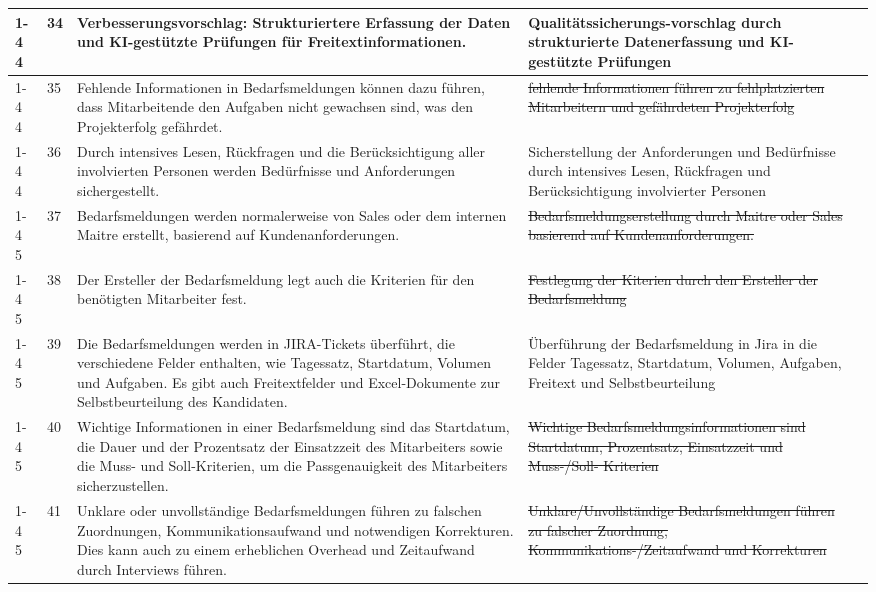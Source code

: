 \begin{longtable}{| p{0.5cm} | p{0.5cm} | p{4cm} | p{4cm} | p{4cm} |}
	\cline{1-4}
	4 & 34 & Verbesserungsvorschlag: Strukturiertere Erfassung der Daten und KI-gestützte Prüfungen für Freitextinformationen. & Qualitätssicherungs-vorschlag durch strukturierte Datenerfassung und KI-gestützte Prüfungen & \\ 
	\cline{1-4}
	4 & 35 & Fehlende Informationen in Bedarfsmeldungen können dazu führen, dass Mitarbeitende den Aufgaben nicht gewachsen sind, was den Projekterfolg gefährdet. & \st{fehlende Informationen führen zu fehlplatzierten Mitarbeitern und gefährdeten Projekterfolg} & \\ 
	\cline{1-4}
	4 & 36 & Durch intensives Lesen, Rückfragen und die Berücksichtigung aller involvierten Personen werden Bedürfnisse und Anforderungen sichergestellt. & Sicherstellung der Anforderungen und Bedürfnisse durch intensives Lesen, Rückfragen und Berücksichtigung involvierter Personen & \\ 
	\cline{1-4}
	5 & 37 & Bedarfsmeldungen werden normalerweise von Sales oder dem internen Maitre erstellt, basierend auf Kundenanforderungen. & \st{Bedarfsmeldungserstellung durch Maitre oder Sales basierend auf Kundenanforderungen.} & \\ 
	\cline{1-4}
	5 & 38 & Der Ersteller der Bedarfsmeldung legt auch die Kriterien für den benötigten Mitarbeiter fest. & \st{Festlegung der Kiterien durch den Ersteller der Bedarfsmeldung} & \\ 
	\cline{1-4}
	5 & 39 & Die Bedarfsmeldungen werden in JIRA-Tickets überführt, die verschiedene Felder enthalten, wie Tagessatz, Startdatum, Volumen und Aufgaben. Es gibt auch Freitextfelder und Excel-Dokumente zur Selbstbeurteilung des Kandidaten. & Überführung der Bedarfsmeldung in Jira in die Felder Tagessatz, Startdatum, Volumen, Aufgaben, Freitext und Selbstbeurteilung & \\ 
	\cline{1-4}
	5 & 40 & Wichtige Informationen in einer Bedarfsmeldung sind das Startdatum, die Dauer und der Prozentsatz der Einsatzzeit des Mitarbeiters sowie die Muss- und Soll-Kriterien, um die Passgenauigkeit des Mitarbeiters sicherzustellen. & \st{Wichtige Bedarfsmeldungsinformationen sind Startdatum, Prozentsatz, Einsatzzeit und Muss-/Soll- Kriterien} & \\ 
	\cline{1-4}
	5 & 41 & Unklare oder unvollständige Bedarfsmeldungen führen zu falschen Zuordnungen, Kommunikationsaufwand und notwendigen Korrekturen. Dies kann auch zu einem erheblichen Overhead und Zeitaufwand durch Interviews führen. & \st{Unklare/Unvollständige Bedarfsmeldungen führen zu falscher Zuordnung, Kommunikations-/Zeitaufwand und Korrekturen} & \\ 

\end{longtable}
